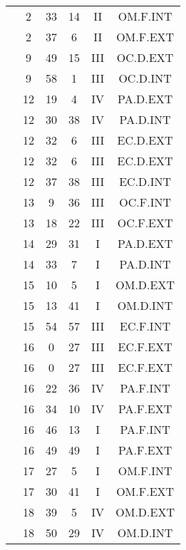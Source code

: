 \documentclass[12pt, a4paper]{article}
\begin{document}
\begin{multicols}{3}
{\begin{tabular}{c c c c c c}
	 	 	 	 & 2 & 33 & 14 & II & OM.F.INT\\%
	 	 	 	 & 2 & 37 & 6 & II & OM.F.EXT\\%
	 	 	 	 & 9 & 49 & 15 & III & OC.D.EXT\\%
	 	 	 	 & 9 & 58 & 1 & III & OC.D.INT\\%
	 	 	 	 & 12 & 19 & 4 & IV & PA.D.EXT\\%
	 	 	 	 & 12 & 30 & 38 & IV & PA.D.INT\\%
	 	 	 	 & 12 & 32 & 6 & III & EC.D.EXT\\%
	 	 	 	 & 12 & 32 & 6 & III & EC.D.EXT\\%
	 	 	 	 & 12 & 37 & 38 & III & EC.D.INT\\%
	 	 	 	 & 13 & 9 & 36 & III & OC.F.INT\\%
	 	 	 	 & 13 & 18 & 22 & III & OC.F.EXT\\%
	 	 	 	 & 14 & 29 & 31 & I & PA.D.EXT\\%
	 	 	 	 & 14 & 33 & 7 & I & PA.D.INT\\%
	 	 	 	 & 15 & 10 & 5 & I & OM.D.EXT\\%
	 	 	 	 & 15 & 13 & 41 & I & OM.D.INT\\%
	 	 	 	 & 15 & 54 & 57 & III & EC.F.INT\\%
	 	 	 	 & 16 & 0 & 27 & III & EC.F.EXT\\%
	 	 	 	 & 16 & 0 & 27 & III & EC.F.EXT\\%
	 	 	 	 & 16 & 22 & 36 & IV & PA.F.INT\\%
	 	 	 	 & 16 & 34 & 10 & IV & PA.F.EXT\\%
	 	 	 	 & 16 & 46 & 13 & I & PA.F.INT\\%
	 	 	 	 & 16 & 49 & 49 & I & PA.F.EXT\\%
	 	 	 	 & 17 & 27 & 5 & I & OM.F.INT\\%
	 	 	 	 & 17 & 30 & 41 & I & OM.F.EXT\\%
	 	 	 	 & 18 & 39 & 5 & IV & OM.D.EXT\\%
	 	 	 	 & 18 & 50 & 29 & IV & OM.D.INT\\%
	 	 \end{tabular}
 	}
\end{multicols}
\end{document}
